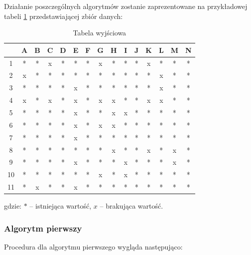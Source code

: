\documentclass[12pt,twoside]{article}
\begin{document}
Działanie poszczególnych algorytmów zostanie zaprezentowane na przykładowej tabeli \ref{tab:base}
przedstawiającej zbiór danych:
\begin{table}[ht]
    \caption{Tabela wyjściowa}
    \centering
    \begin{tabular}{|c|c|c|c|c|c|c|c|c|c|c|c|c|c|c|}
        \hline
           & A & B & C & D & E & F & G & H & I & J & K & L & M & N \\ \hline
        1  & * & * & x & * & * & * & x & * & * & * & x & * & * & * \\ \hline
        2  & x & * & * & * & * & * & * & * & * & * & * & x & * & * \\ \hline
        3  & * & * & * & * & x & * & * & * & * & * & * & x & * & * \\ \hline
        4  & x & * & x & * & x & * & x & x & * & * & x & x & * & * \\ \hline
        5  & * & * & * & * & x & * & * & x & x & * & * & * & * & * \\ \hline
        6  & * & * & * & * & x & * & x & x & * & * & * & * & * & * \\ \hline
        7  & * & * & * & * & x & * & * & * & * & * & * & * & * & * \\ \hline
        8  & * & * & * & * & * & * & * & x & * & * & x & * & x & * \\ \hline
        9  & * & * & * & * & x & * & * & * & x & * & * & * & x & * \\ \hline
        10 & * & * & * & * & * & * & x & * & x & * & * & * & * & * \\ \hline
        11 & * & x & * & * & x & * & * & * & * & * & * & * & * & * \\ \hline
    \end{tabular}
    \label{tab:base}
\end{table}
\FloatBarrier
gdzie: $*$ -- istniejąca wartość, $x$ -- brakująca wartość.

\subsubsection{Algorytm pierwszy}

Procedura dla algorytmu pierwszego wygląda następująco:
\end{document}
